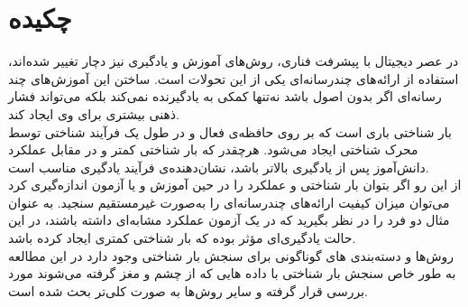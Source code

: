 \documentclass[12pt,a4paper]{article}
\begin{document}
\section*{چکیده}
در عصر دیجیتال با پیشرفت فناری، روش‌های آموزش و یادگیری نیز دچار تغییر شده‌اند، استفاده از ارائه‌های چندرسانه‌ای یکی از این تحولات است. ساختن این آموزش‌‌های چند رسانه‌ای اگر بدون اصول باشد نه‌تنها کمکی به یادگیرنده نمی‌کند بلکه می‌تواند فشار ذهنی بیشتری برای وی ایجاد کند.
\\
بار شناختی باری است که بر روی حافظه‌ی فعال و در طول یک فرآیند شناختی توسط محرک شناختی ایجاد
می‌شود. هرچقدر که بار شناختی کمتر و در مقابل عملکرد دانش‌آموز پس از یادگیری بالاتر باشد، نشان‌دهنده‌ی فرآیند یادگیری مناسب است.
\\
از این رو اگر بتوان بار شناختی و عملکرد را در
حین آموزش و یا آزمون اندازه‌گیری کرد می‌توان میزان کیفیت ارائه‌های چندرسانه‌ای را به‌صورت غیرمستقیم سنجید. به عنوان مثال دو فرد را در نظر بگیرید که در یک آزمون عملکرد مشابه‌ای داشته باشند، در این حالت یادگیری‌ای مؤثر بوده که بار شناختی کمتری ایجاد کرده باشد.
\\
روش‌ها و دسته‌بندی های گوناگونی برای سنجش بار شناختی وجود دارد در این مطالعه به طور خاص سنجش بار شناختی با داده هایی که از چشم و مغز گرفته می‌شوند مورد بررسی قرار گرفته و سایر روش‌ها به صورت کلی‌تر بحث شده است.
	




	

\printindex

\setLTRbibitems


\end{document}
